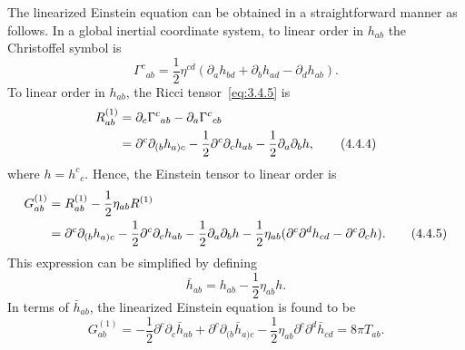 The linearized Einstein equation can be obtained in a straightforward manner as
follows. In a global inertial coordinate system, to linear order in \(h_{ab}\) the
Christoffel symbol is
\begin{equation}
  \Gamma^c{}_{ab}=\frac12\eta^{cd}
  (\partial_ah_{bd}+\partial_bh_{ad}-\partial_dh_{ab}) .
  \tag{4.4.3}\label{eq:4.4.3}
\end{equation}
To linear order in \(h_{ab}\), the Ricci tensor~\eqref{eq:3.4.5} is
\begin{align}
  R^{(1)}_{ab}
    &=\partial_c\Gamma^c{}_{ab}-\partial_a\Gamma^c{}_{cb}\notag\\
    &=\partial^c\partial_{(b}h_{a)c}
      -\frac12\partial^c\partial_ch_{ab}
      -\frac12\partial_a\partial_bh ,
  \tag{4.4.4}\label{eq:4.4.4}
\end{align}
where \(h=h^c{}_c\). Hence, the Einstein tensor to linear order is
\begin{align}
  G^{(1)}_{ab}
    &=R^{(1)}_{ab}-\frac12\eta_{ab}R^{(1)}\notag\\
    &=\partial^c\partial_{(b}h_{a)c}
      -\frac12\partial^c\partial_ch_{ab}
      -\frac12\partial_a\partial_bh
      -\frac12\eta_{ab}
        (\partial^c\partial^dh_{cd}-\partial^c\partial_ch) .
  \tag{4.4.5}\label{eq:4.4.5}
\end{align}
This expression can be simplified by defining
\begin{equation}
  \bar h_{ab}=h_{ab}-\frac12\eta_{ab}h .
  \tag{4.4.6}\label{eq:4.4.6}
\end{equation}
In terms of \(\bar h_{ab}\), the linearized Einstein equation is found to be
\begin{equation}
  G^{(1)}_{ab}=-\frac12\partial^c\partial_c\bar h_{ab}
    +\partial^c\partial_{(b}\bar h_{a)c}
    -\frac12\eta_{ab}\partial^c\partial^d\bar h_{cd}=8\pi T_{ab} .
  \tag{4.4.7}\label{eq:4.4.7}
\end{equation}

